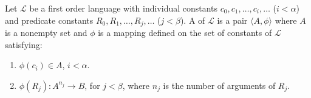 Let $\mathcal{L}$ be a first order language with individual constants $c_0, c_1, \ldots, c_i, \ldots$ ($i < \alpha$) and predicate constants $R_0, R_1, \ldots, R_j, \ldots$ ($j < \beta$). A  of $\mathcal{L}$ is a pair $\langle A, \phi \rangle$ where $A$ is a nonempty set and $\phi$ is a mapping defined on the set of constants of $\mathcal{L}$ satisfying:
\begin{enumerate}
\item $\phi(c_i) \in A$, $i < \alpha$.
\item $\phi(R_j) \colon A^{n_j} \to B$, for $j < \beta$, where $n_j$ is the number of arguments of $R_j$.
\end{enumerate}

